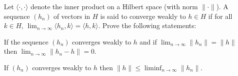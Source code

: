 Let $\langle \cdot ,\cdot \rangle$ denote the inner product on a
Hilbert space (with norm $\|\cdot \|$). A sequence $(h_n)$ of vectors
in $H$ is said to converge weakly to $h\in H$ if for all $k\in H$,
$\lim_{n\rightarrow \infty}\langle h_n,k \rangle=\langle h,k \rangle$.
Prove the following statements:
\begin{alist}
\item If the sequence $(h_n)$ converges weakly to $h$ and if
$\lim_{n\rightarrow \infty}\|h_n\|=\|h\|$ then $\lim_{n\rightarrow
\infty}\|h_n-h\|=0$.
\item If $(h_n)$ converges weakly to $h$ then $\|h\|\leq
\liminf_{n\rightarrow \infty} \|h_n\|$.
\end{alist}
